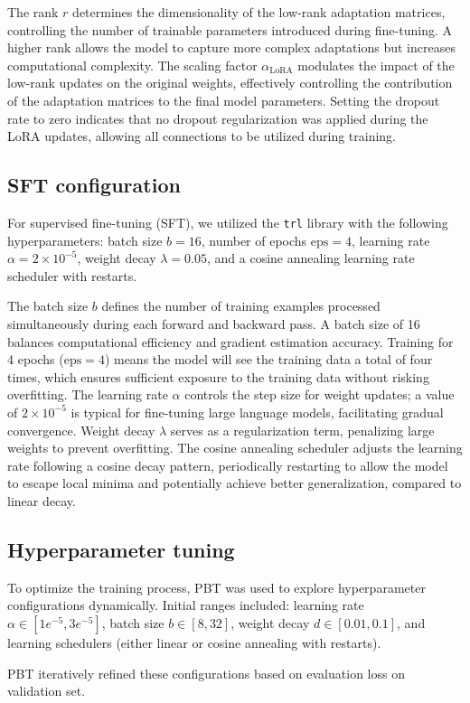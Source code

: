 \documentclass{article}
\newcounter{para}
\begin{document}
The rank \( r \) determines the dimensionality of the low-rank adaptation matrices, controlling the number of trainable parameters introduced during fine-tuning. A higher rank allows the model to capture more complex adaptations but increases computational complexity. The scaling factor \( \alpha_{\text{LoRA}} \) modulates the impact of the low-rank updates on the original weights, effectively controlling the contribution of the adaptation matrices to the final model parameters. Setting the dropout rate to zero indicates that no dropout regularization was applied during the LoRA updates, allowing all connections to be utilized during training.

\subsection{SFT configuration}

For supervised fine-tuning (SFT), we utilized the \texttt{trl} library with the following hyperparameters: batch size \( b = 16 \), number of epochs \( \text{eps} = 4 \), learning rate \( \alpha = 2 \times 10^{-5} \), weight decay \( \lambda = 0.05 \), and a cosine annealing learning rate scheduler with restarts.

The batch size \( b \) defines the number of training examples processed simultaneously during each forward and backward pass. A batch size of 16 balances computational efficiency and gradient estimation accuracy. Training for 4 epochs (\( \text{eps} = 4 \)) means the model will see the training data a total of four times, which ensures sufficient exposure to the training data without risking overfitting. The learning rate \( \alpha \) controls the step size for weight updates; a value of \( 2 \times 10^{-5} \) is typical for fine-tuning large language models, facilitating gradual convergence. Weight decay \( \lambda \) serves as a regularization term, penalizing large weights to prevent overfitting. The cosine annealing scheduler adjusts the learning rate following a cosine decay pattern, periodically restarting to allow the model to escape local minima and potentially achieve better generalization, compared to linear decay.

\subsection{Hyperparameter tuning}

To optimize the training process, PBT was used to explore hyperparameter configurations dynamically. Initial ranges included: learning rate $\alpha \in [1e^{-5}, 3e^{-5}]$, batch size $b\in [8,32]$, weight decay $d\in[0.01,0.1]$, and learning schedulers (either linear or cosine annealing with restarts).

PBT iteratively refined these configurations based on evaluation loss on validation set.
\end{document}
